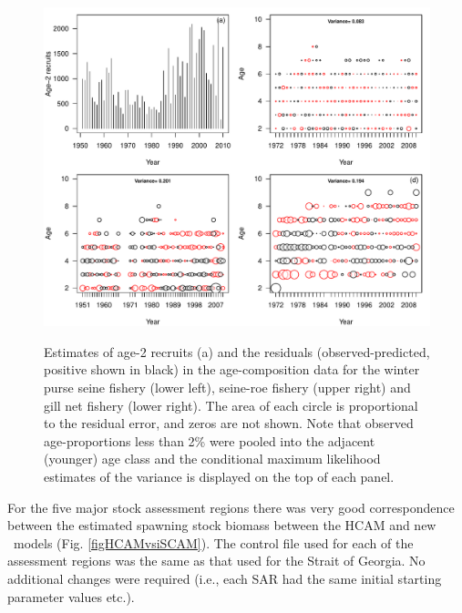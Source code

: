 \begin{figure}[!tbp]
	\includegraphics[width=\textwidth]{../Figs/fig3_HCAM_ctrl.pdf}\\
	\caption{Estimates of age-2 recruits (a) and the residuals (observed-predicted, positive shown in black)  in the age-composition data for the winter purse seine fishery (lower left), seine-roe fishery (upper right) and gill net fishery (lower right). The area of each circle is proportional to the residual error, and zeros are not shown. Note that observed age-proportions less than 2\% were pooled into the adjacent (younger) age class and the conditional maximum likelihood estimates of the variance is displayed on the top of each panel.}\label{fig3_HCAM_ctrl}
\end{figure}

For the five major stock assessment regions there was very good correspondence between the estimated spawning stock biomass between the HCAM and new \iscam\  models (Fig. \ref{figHCAMvsiSCAM}). The control file used for each of the assessment regions was the same as that used for the Strait of Georgia.  No additional changes were required (i.e., each SAR had the same initial starting parameter values etc.).


